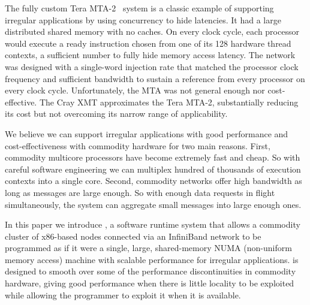 The fully custom Tera MTA-2~\cite{tera:mta1} system is a classic example of
supporting irregular applications by using concurrency to hide latencies. It
had a large distributed shared memory with no caches. On every clock cycle,
each processor would execute a ready instruction chosen from one of its 128
hardware thread contexts, a sufficient number to fully hide memory access
latency. The network was designed with a single-word injection rate that
matched the processor clock frequency and sufficient bandwidth to sustain a
reference from every processor on every clock cycle. Unfortunately, the MTA
was not general enough nor cost-effective. The Cray XMT approximates the Tera
MTA-2, substantially reducing its cost but not overcoming its narrow range of
applicability.

We believe we can support irregular applications with good performance and
cost-effectiveness with commodity hardware for two main reasons. First,
commodity multicore processors have become extremely fast and cheap. So with
careful software engineering we can multiplex hundred of thousands of
execution contexts into a single core. Second, commodity networks offer high
bandwidth as long as messages are large enough. So with enough data requests
in flight simultaneously, the system can aggregate small messages into large
enough ones.

In this paper we introduce \Grappa, a software runtime system that allows a
commodity cluster of x86-based nodes connected via an InfiniBand network to be
programmed as if it were a single, large, shared-memory NUMA (non-uniform
memory access) machine with scalable performance for irregular applications.
\Grappa is designed to smooth over some of the performance discontinuities in
commodity hardware, giving good performance when there is little locality to
be exploited while allowing the programmer to exploit it when it is available.

